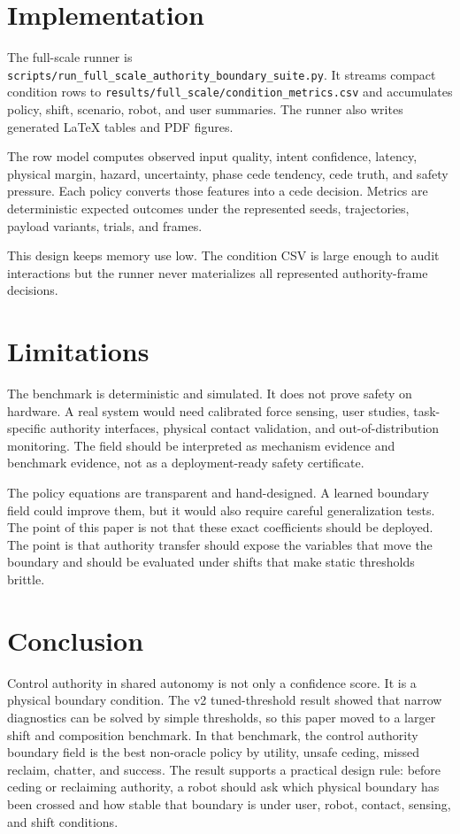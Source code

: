 \documentclass{article}
\begin{document}
\section{Implementation}

The full-scale runner is \texttt{scripts/run\_full\_scale\_authority\_boundary\_suite.py}. It streams compact condition rows to \texttt{results/full\_scale/condition\_metrics.csv} and accumulates policy, shift, scenario, robot, and user summaries. The runner also writes generated LaTeX tables and PDF figures.

The row model computes observed input quality, intent confidence, latency, physical margin, hazard, uncertainty, phase cede tendency, cede truth, and safety pressure. Each policy converts those features into a cede decision. Metrics are deterministic expected outcomes under the represented seeds, trajectories, payload variants, trials, and frames.

This design keeps memory use low. The condition CSV is large enough to audit interactions but the runner never materializes all represented authority-frame decisions.

\section{Limitations}

The benchmark is deterministic and simulated. It does not prove safety on hardware. A real system would need calibrated force sensing, user studies, task-specific authority interfaces, physical contact validation, and out-of-distribution monitoring. The field should be interpreted as mechanism evidence and benchmark evidence, not as a deployment-ready safety certificate.

The policy equations are transparent and hand-designed. A learned boundary field could improve them, but it would also require careful generalization tests. The point of this paper is not that these exact coefficients should be deployed. The point is that authority transfer should expose the variables that move the boundary and should be evaluated under shifts that make static thresholds brittle.

\section{Conclusion}

Control authority in shared autonomy is not only a confidence score. It is a physical boundary condition. The v2 tuned-threshold result showed that narrow diagnostics can be solved by simple thresholds, so this paper moved to a larger shift and composition benchmark. In that benchmark, the control authority boundary field is the best non-oracle policy by utility, unsafe ceding, missed reclaim, chatter, and success. The result supports a practical design rule: before ceding or reclaiming authority, a robot should ask which physical boundary has been crossed and how stable that boundary is under user, robot, contact, sensing, and shift conditions.
\end{document}
